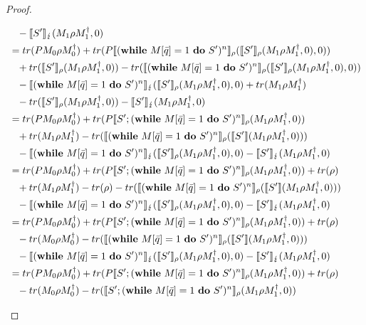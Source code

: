 \documentclass[a4paper,UKenglish,cleveref, autoref, thm-restate]{lipics-v2021}
\begin{document}
\begin{proof}
\begin{itemize}
\begin{itemize}
\begin{align*}
                &\phantom{=}- \semanticsErr{S'}(M_1 \rho M_1^\dagger,0)\\
                &= tr( P  M_0 \rho M_0^\dagger) + tr(P \semanticsRho{(\while')^n}(\semanticsRho{S'}(M_1 \rho M_1^\dagger,0),0))\\
                &\phantom{=}+ tr(\semanticsRho{S'}(M_1 \rho M_1^\dagger,0)) -tr(\semanticsRho{(\while')^n}(\semanticsRho{S'}(M_1 \rho M_1^\dagger,0),0))\\
                &\phantom{=}- \semanticsErr{(\while')^n}(\semanticsRho{S'}(M_1 \rho M_1^\dagger,0),0)+ tr(M_1 \rho M_1^\dagger)\\
                &\phantom{=}-tr(\semanticsRho{S'}(M_1 \rho M_1^\dagger,0))- \semanticsErr{S'}(M_1 \rho M_1^\dagger,0)\\
                &= tr(P M_0 \rho M_0^\dagger) + tr(P \semanticsRho{S';(\while')^n}(M_1 \rho M_1^\dagger,0))\\
                &\phantom{=}+tr(M_1 \rho M_1^\dagger)-tr(\semanticsRho{(\while')^n}(\semantics{S'}(M_1 \rho M_1^\dagger,0)))\\
                &\phantom{=}-\semanticsErr{(\while')^{n}}(\semanticsRho{S'}(M_1\rho M_1^\dagger,0),0) - \semanticsErr{S'}(M_1\rho M_1^\dagger,0)
                \\
                &= tr(P M_0 \rho M_0^\dagger) + tr(P \semanticsRho{S';(\while')^n}(M_1 \rho M_1^\dagger,0))+ tr(\rho)\\
                &\phantom{=}+tr(M_1 \rho M_1^\dagger)-tr(\rho) - tr(\semanticsRho{(\while')^n}(\semantics{S'}(M_1 \rho M_1^\dagger,0)))\\
                &\phantom{=}-\semanticsErr{(\while')^{n}}(\semanticsRho{S'}(M_1\rho M_1^\dagger,0),0) - \semanticsErr{S'}(M_1\rho M_1^\dagger,0)
                \\
                &= tr(P M_0 \rho M_0^\dagger) + tr(P \semanticsRho{S';(\while')^n}(M_1 \rho M_1^\dagger,0))+ tr(\rho)\\
                &\phantom{=}-tr(M_0 \rho M_0^\dagger)- tr(\semanticsRho{(\while')^n}(\semantics{S'}(M_1 \rho M_1^\dagger,0)))\\
                &\phantom{=}-\semanticsErr{(\while')^{n}}(\semanticsRho{S'}(M_1\rho M_1^\dagger,0),0) - \semanticsErr{S'}(M_1\rho M_1^\dagger,0)\\
                &= tr(P M_0 \rho M_0^\dagger) + tr(P \semanticsRho{S';(\while')^n}(M_1 \rho M_1^\dagger,0))+ tr(\rho)\\
                &\phantom{=}-tr(M_0 \rho M_0^\dagger) -tr(\semanticsRho{S';(\while')^n}(M_1 \rho M_1^\dagger,0))\\

\end{align*}
\end{itemize}
\end{itemize}
\end{proof}
\end{document}
